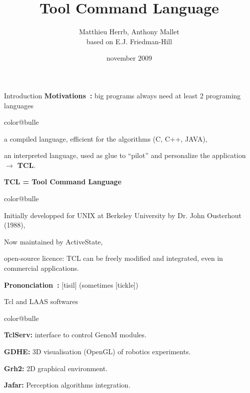 \documentclass[a4paper,landscape,smooth]{show}
\title{{\Huge T}ool {\Huge C}ommand {\Huge L}anguage}
\author{Matthieu Herrb, Anthony Mallet\\
 based on E.J. Friedman-Hill}
\date{november 2009}
\begin{document}
\maketitle
\small


\begin{part}{Introduction}{}
   \vfill
   {\bf Motivations~:} big programs always need at least 2 programing languages

   \begin{bitemize}{color@bulle}
      \item a compiled language, efficient for the algorithms (C, C++, JAVA),

      \item an interpreted language, used as glue to ``pilot''
	    and personalize the application {\bf $\rightarrow$ TCL}.
   \end{bitemize}

   \vfill
   {\bf TCL = Tool Command Language}
   \begin{bitemize}{color@bulle}
      \item Initially developped for UNIX at Berkeley University
	    by Dr. John Ousterhout (1988),
      \item Now maintained by ActiveState,

      \item open-source licence: TCL can be freely modified and
integrated, even in commercial applications.

   \end{bitemize}

   \vfill
   {\bf Prononciation~:} [tisil] (sometimes [tickle])

   \vfill
\end{part}


\begin{tslide}{Tcl and LAAS softwares}
   \vfill
   \begin{bitemize}{color@bulle}
      \item \textbf{TclServ:} interface to control GenoM modules.
      \item \textbf{GDHE:} 3D visualisation (OpenGL) of robotics experiments.
      \item \textbf{Grh2:} 2D graphical environment.
      \item \textbf{Jafar:} Perception algorithms integration.
   \end{bitemize}
   \vfill
\end{tslide}
\end{document}
